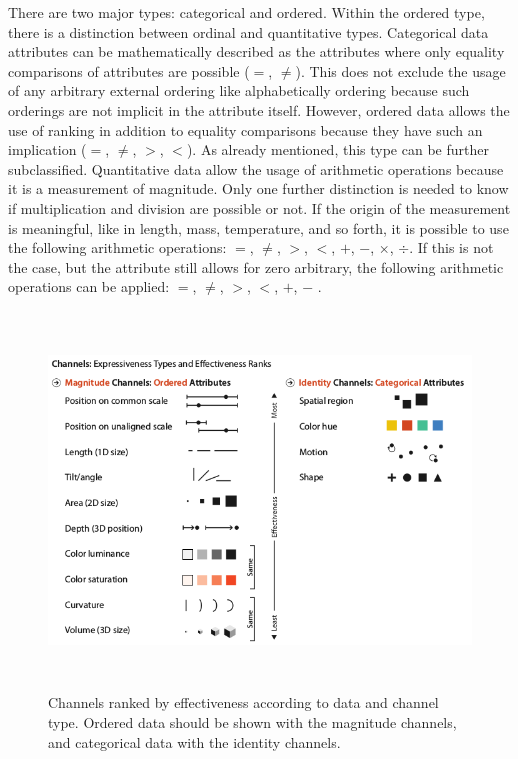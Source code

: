 There are two major types: categorical and ordered. Within the ordered type, there is a distinction between ordinal and quantitative types. Categorical data attributes can be mathematically described as the attributes where only equality comparisons of attributes are possible ($=$, $\neq$). This does not exclude the usage of any arbitrary external ordering like alphabetically ordering because such orderings are not implicit in the attribute itself. However, ordered data allows the use of ranking in addition to equality comparisons because they have such an implication ($=$, $\neq$, $>$, $<$). As already mentioned, this type can be further subclassified. Quantitative data allow the usage of arithmetic operations because it is a measurement of magnitude. Only one further distinction is needed to know if multiplication and division are possible or not. If the origin of the measurement is meaningful, like in length, mass, temperature, and so forth, it is possible to use the following arithmetic operations: $=$, $\neq$, $>$, $<$, $+$, $-$, $\times$, $\div$. If this is not the case, but the attribute still allows for zero arbitrary, the following arithmetic operations can be applied: $=$, $\neq$, $>$, $<$, $+$, $-$ .

\begin{figure}[!htb]
\centering
\includegraphics[height=10cm,keepaspectratio]{images/va/channels-ranked.png}
\caption[
    Channels ranked by effectiveness according to data and channel type. Ordered data should be shown with the magnitude channels, and categorical data with the identity channels .
]{Channels ranked by effectiveness according to data and channel type. Ordered data should be shown with the magnitude channels, and categorical data with the identity channels.}
\label{fig:va-channels-ranked}
\end{figure}

